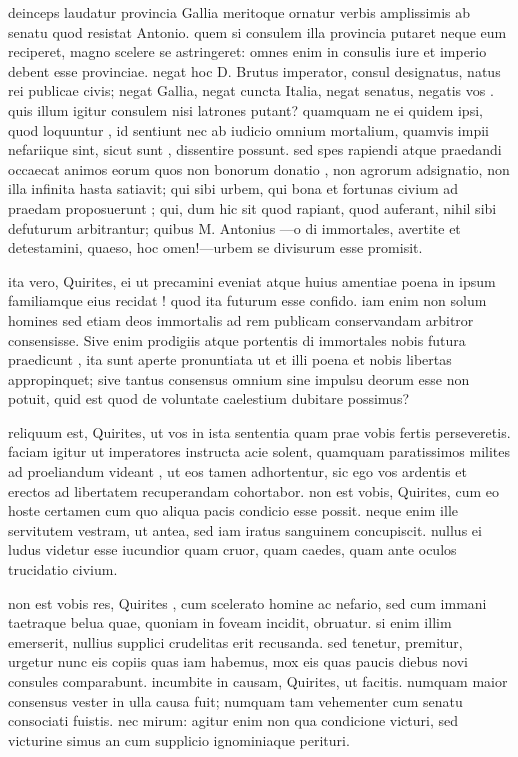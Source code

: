  deinceps laudatur provincia Gallia meritoque ornatur verbis amplissimis ab senatu quod resistat Antonio. quem si consulem illa provincia putaret neque eum reciperet, magno scelere se astringeret: omnes enim in consulis iure et imperio debent esse provinciae. negat hoc D. Brutus imperator, consul designatus, natus rei publicae civis; negat Gallia, negat cuncta Italia, negat senatus, negatis vos . quis illum igitur consulem nisi latrones putant? quamquam ne ei quidem ipsi, quod loquuntur , id sentiunt nec ab iudicio omnium mortalium, quamvis impii nefariique sint, sicut sunt , dissentire possunt. sed spes rapiendi atque praedandi occaecat animos eorum quos non bonorum donatio , non agrorum adsignatio, non illa infinita hasta satiavit; qui sibi urbem, qui bona et fortunas civium ad praedam proposuerunt ; qui, dum hic sit quod rapiant, quod auferant, nihil sibi defuturum arbitrantur; quibus M. Antonius —o di immortales, avertite et detestamini, quaeso, hoc omen!—urbem se divisurum esse promisit.

 ita vero, Quirites, ei ut precamini eveniat atque huius amentiae poena in ipsum familiamque eius recidat ! quod ita futurum esse confido. iam enim non solum homines sed etiam deos immortalis ad rem publicam conservandam arbitror consensisse. Sive enim prodigiis atque portentis di immortales nobis futura praedicunt , ita sunt aperte pronuntiata ut et illi poena et nobis libertas appropinquet; sive tantus consensus omnium sine impulsu deorum esse non potuit, quid est quod de voluntate caelestium dubitare possimus?

 reliquum est, Quirites, ut vos in ista sententia quam prae vobis fertis perseveretis. faciam igitur ut imperatores instructa acie solent, quamquam paratissimos milites ad proeliandum videant , ut eos tamen adhortentur, sic ego vos ardentis et erectos ad libertatem recuperandam cohortabor. non est vobis, Quirites, cum eo hoste certamen cum quo aliqua pacis condicio esse possit. neque enim ille servitutem vestram, ut antea, sed iam iratus sanguinem concupiscit. nullus ei ludus videtur esse iucundior quam cruor, quam caedes, quam ante oculos trucidatio civium.

 non est vobis res, Quirites , cum scelerato homine ac nefario, sed cum immani taetraque belua quae, quoniam in foveam incidit, obruatur. si enim illim emerserit, nullius supplici crudelitas erit recusanda. sed tenetur, premitur, urgetur nunc eis copiis quas iam habemus, mox eis quas paucis diebus novi consules comparabunt. incumbite in causam, Quirites, ut facitis. numquam maior consensus vester in ulla causa fuit; numquam tam vehementer cum senatu consociati fuistis. nec mirum: agitur enim non qua condicione victuri, sed victurine simus an cum supplicio ignominiaque perituri.

